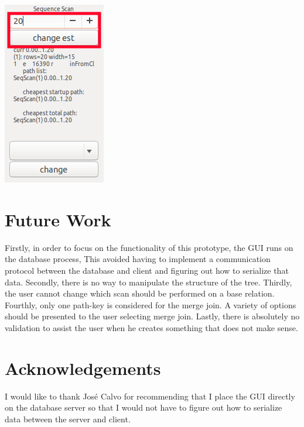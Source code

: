 \documentclass[letterpaper,10pt]{article}
\begin{document}
\begin{center}
\includegraphics[scale=0.5]{change-estimate.png}
\end{center}


\section{Future Work}
Firstly, in order to focus on the functionality of this prototype, the GUI runs
on the database process, This avoided having to implement a communication
protocol between the database and client and figuring out how to serialize that
data. Secondly, there is no way to manipulate the structure of the tree.
Thirdly, the user cannot change which scan should be performed on a base
relation. Fourthly, only one path-key is considered for the merge join. A
variety of options should be presented to the user selecting merge join. Lastly,
there is absolutely no validation to assist the user when he creates something
that does not make sense.

\section{Acknowledgements}
I would like to thank José Calvo for recommending that I place the GUI directly
on the database server so that I would not have to figure out how to serialize
data between the server and client.

\nocite{*}               

     
\end{document}
